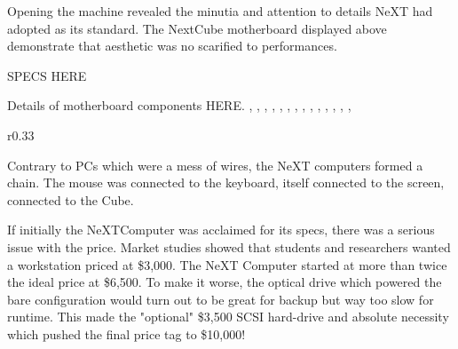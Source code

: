 \par
Opening the machine revealed the minutia and attention to details NeXT had adopted as its standard. The NextCube motherboard displayed above demonstrate that aesthetic was no scarified to performances.\\
\par
SPECS HERE
\pagebreak

\vspace{50 mm}
\par
Details of motherboard components HERE. 
,
,
,
,
,
,
,
,
,
,
,
,
,
,




\begin{figure}[H]
\centering
{}
\end{figure}
\pagebreak
\par


\begin{figure}[H]
\centering
{}
\end{figure}
\pagebreak
 


\begin{wrapfigure}[9]{r}{0.33\textwidth}
\centering
{}
\end{wrapfigure}


Contrary to PCs which were a mess of wires, the NeXT computers formed a chain. The mouse was connected to the keyboard, itself connected to the screen, connected to the Cube.\\


\par


If initially the NeXTComputer was acclaimed for its specs, there was a serious issue with the price. Market studies showed that students and researchers wanted a workstation priced at \$3,000. The NeXT Computer started at more than twice the ideal price at \$6,500. To make it worse, the optical drive which powered the bare configuration would turn out to be great for backup but way too slow for runtime. This made the "optional" \$3,500 SCSI hard-drive and absolute necessity which pushed the final price tag to \$10,000!\\
\par




